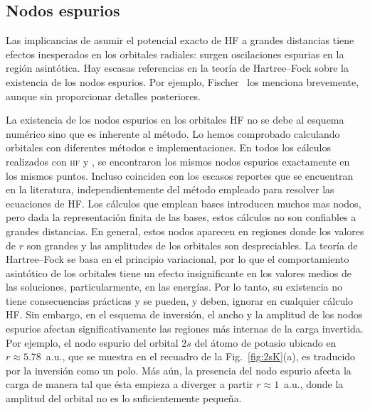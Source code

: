 \subsection{Nodos espurios}
\label{subsec:espuriosHF}

Las implicancias de asumir el potencial exacto de HF a grandes 
distancias tiene efectos inesperados en los orbitales radiales: surgen
oscilaciones espurias en la región asintótica. Hay escasas referencias 
en la teoría de Hartree--Fock sobre la existencia de los nodos espurios. 
Por ejemplo, Fischer~\cite{FroeseFischer:97} los menciona brevemente, 
aunque sin proporcionar detalles posteriores. 

La existencia de los nodos espurios en los orbitales HF no se debe al 
esquema numérico sino que es inherente al método. 
Lo hemos comprobado calculando orbitales con diferentes métodos e 
implementaciones. En todos los cálculos realizados con \textsc{hf} y 
, se encontraron los mismos nodos espurios exactamente en 
los mismos puntos. Incluso coinciden con los escasos reportes que se 
encuentran en la literatura, independientemente del método empleado para 
resolver las ecuaciones de HF.  Los cálculos que emplean bases 
introducen muchos mas nodos, pero dada la representación finita de las 
bases, estos cálculos no son confiables a grandes distancias.
En general, estos nodos aparecen en regiones donde los valores de
$r$ son grandes y las amplitudes de los orbitales son despreciables.
La teoría de Hartree--Fock se basa en el principio variacional, por lo 
que el comportamiento asintótico de los orbitales tiene un efecto 
insignificante en los valores medios de las soluciones, particularmente, 
en las energías. Por lo tanto, su existencia no tiene consecuencias 
prácticas y se pueden, y deben, ignorar en cualquier cálculo HF. 
Sin embargo, en el esquema de inversión, el ancho y la amplitud de los 
nodos espurios afectan significativamente las regiones más internas de 
la carga invertida. Por ejemplo, el nodo espurio del orbital $2s$ del 
átomo de potasio ubicado en $r\approx 5.78$~a.u., que se muestra en el 
recuadro de la Fig.~\ref{fig:2sK}(a), es traducido por la inversión como
un polo. Más aún, la presencia del nodo espurio afecta la carga de 
manera tal que ésta empieza a diverger a partir $r\approx 1$~a.u., donde 
la amplitud del orbital no es lo suficientemente pequeña. 

